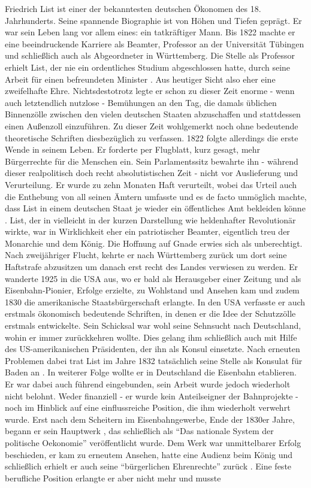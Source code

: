 Friedrich List ist einer der bekanntesten deutschen Ökonomen des 18. Jahrhunderts. Seine spannende Biographie ist von Höhen und Tiefen geprägt. Er war sein Leben lang vor allem eines: ein tatkräftiger Mann. Bis 1822 machte er eine beeindruckende Karriere als Beamter, Professor an der Universität Tübingen und schließlich auch als Abgeordneter in Württemberg. Die Stelle als Professor erhielt List, der nie ein ordentliches Studium abgeschlossen hatte, durch seine Arbeit für einen befreundeten Minister \parencite[S. 227]{Hauser1989}. Aus heutiger Sicht also eher eine zweifelhafte Ehre. Nichtsdestotrotz legte er schon zu dieser Zeit enorme - wenn auch letztendlich nutzlose - Bemühungen an den Tag, die damals üblichen Binnenzölle zwischen den vielen deutschen Staaten abzuschaffen und stattdessen einen Außenzoll einzuführen. Zu dieser Zeit wohlgemerkt noch ohne bedeutende theoretische Schriften diesbezüglich zu verfassen. 1822 folgte allerdings die erste Wende in seinem Leben. Er forderte per Flugblatt, kurz gesagt, mehr Bürgerrechte für die Menschen ein. Sein Parlamentssitz bewahrte ihn - während dieser realpolitisch doch recht absolutistischen Zeit - nicht vor Auslieferung und Verurteilung. Er wurde zu zehn Monaten Haft verurteilt, wobei das Urteil auch die Enthebung von all seinen Ämtern umfasste und es de facto unmöglich machte, dass List in einem deutschen Staat je wieder ein öffentliches Amt bekleiden könne \parencite[S. 229]{Hauser1989}. List, der in vielleicht in der kurzen Darstellung wie heldenhafter Revolutionär wirkte, war in Wirklichkeit eher ein patriotischer Beamter, eigentlich treu der Monarchie und dem König. Die Hoffnung auf Gnade erwies sich als unberechtigt. Nach zweijähriger Flucht, kehrte er nach Württemberg zurück um dort seine Haftstrafe abzusitzen um danach erst recht des Landes verwiesen zu werden. Er wanderte 1925 in die USA aus, wo er bald als Herausgeber einer Zeitung und als Eisenbahn-Pionier, Erfolge erzielte, zu Wohlstand und Ansehen kam und zudem 1830 die amerikanische Staatsbürgerschaft erlangte. In den USA verfasste er auch erstmals ökonomisch bedeutende Schriften, in denen er die Idee der Schutzzölle erstmals entwickelte. Sein Schicksal war wohl seine Sehnsucht nach Deutschland, wohin er immer zurückkehren wollte. Dies gelang ihm schließlich auch mit Hilfe des US-amerikanischen Präsidenten, der ihn als Konsul einsetzte. Nach erneuten Problemen dabei trat List im Jahre 1832 tatsächlich seine Stelle als Konsulat für Baden an \parencite[S. 232]{Hauser1989}. In weiterer Folge wollte er in Deutschland die Eisenbahn etablieren. Er war dabei auch führend eingebunden, sein Arbeit wurde jedoch wiederholt nicht belohnt. Weder finanziell - er wurde kein Anteilseigner der Bahnprojekte - noch im Hinblick auf eine einflussreiche Position, die ihm wiederholt verwehrt wurde. Erst nach dem Scheitern im Eisenbahngewerbe, Ende der 1830er Jahre, begann er sein Hauptwerk \parencite{List1841}, das schließlich als "`Das nationale System der politische Oekonomie"' veröffentlicht wurde. Dem Werk war unmittelbarer Erfolg beschieden, er kam zu erneutem Ansehen, hatte eine  Audienz beim König und schließlich erhielt er auch seine "`bürgerlichen Ehrenrechte"' zurück \parencite[S. 235]{Hauser1989}. Eine feste berufliche Position erlangte er aber nicht mehr und musste 